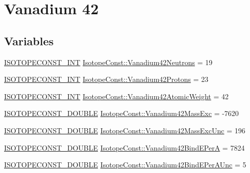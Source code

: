 \hypertarget{group___isotope_const-_vanadium-_v42}{}\section{Vanadium 42}
\label{group___isotope_const-_vanadium-_v42}
\subsection*{Variables}
\begin{DoxyCompactItemize}
\item 
\mbox{\hyperlink{group___isotope_const-_macros_ga5f18360b3e99483a35c32d789e62621c}{I\+S\+O\+T\+O\+P\+E\+C\+O\+N\+S\+T\+\_\+\+I\+NT}} \mbox{\hyperlink{group___isotope_const-_vanadium-_v42_gaf79c2828524366f7be65088d652d6ed3}{Isotope\+Const\+::\+Vanadium42\+Neutrons}} = 19
\item 
\mbox{\hyperlink{group___isotope_const-_macros_ga5f18360b3e99483a35c32d789e62621c}{I\+S\+O\+T\+O\+P\+E\+C\+O\+N\+S\+T\+\_\+\+I\+NT}} \mbox{\hyperlink{group___isotope_const-_vanadium-_v42_ga5efd5885d8545f580df050b13ad47110}{Isotope\+Const\+::\+Vanadium42\+Protons}} = 23
\item 
\mbox{\hyperlink{group___isotope_const-_macros_ga5f18360b3e99483a35c32d789e62621c}{I\+S\+O\+T\+O\+P\+E\+C\+O\+N\+S\+T\+\_\+\+I\+NT}} \mbox{\hyperlink{group___isotope_const-_vanadium-_v42_gac95afbaf5a3d5f0899fb929a5d490cf7}{Isotope\+Const\+::\+Vanadium42\+Atomic\+Weight}} = 42
\item 
\mbox{\hyperlink{group___isotope_const-_macros_ga8f45a7272ce02c0b4c65c44636ed719a}{I\+S\+O\+T\+O\+P\+E\+C\+O\+N\+S\+T\+\_\+\+D\+O\+U\+B\+LE}} \mbox{\hyperlink{group___isotope_const-_vanadium-_v42_ga087a65731033a81f6cfadfc936d63b09}{Isotope\+Const\+::\+Vanadium42\+Mass\+Exc}} = -\/7620
\item 
\mbox{\hyperlink{group___isotope_const-_macros_ga8f45a7272ce02c0b4c65c44636ed719a}{I\+S\+O\+T\+O\+P\+E\+C\+O\+N\+S\+T\+\_\+\+D\+O\+U\+B\+LE}} \mbox{\hyperlink{group___isotope_const-_vanadium-_v42_gaad5b366fdb4297995fa2200ec0a8f39b}{Isotope\+Const\+::\+Vanadium42\+Mass\+Exc\+Unc}} = 196
\item 
\mbox{\hyperlink{group___isotope_const-_macros_ga8f45a7272ce02c0b4c65c44636ed719a}{I\+S\+O\+T\+O\+P\+E\+C\+O\+N\+S\+T\+\_\+\+D\+O\+U\+B\+LE}} \mbox{\hyperlink{group___isotope_const-_vanadium-_v42_ga7f17753bcb0938020a3b6f62deb11647}{Isotope\+Const\+::\+Vanadium42\+Bind\+E\+PerA}} = 7824
\item 
\mbox{\hyperlink{group___isotope_const-_macros_ga8f45a7272ce02c0b4c65c44636ed719a}{I\+S\+O\+T\+O\+P\+E\+C\+O\+N\+S\+T\+\_\+\+D\+O\+U\+B\+LE}} \mbox{\hyperlink{group___isotope_const-_vanadium-_v42_ga164b219403972a0a86df3a6ddd9a6df6}{Isotope\+Const\+::\+Vanadium42\+Bind\+E\+Per\+A\+Unc}} = 5

\end{DoxyCompactItemize}
